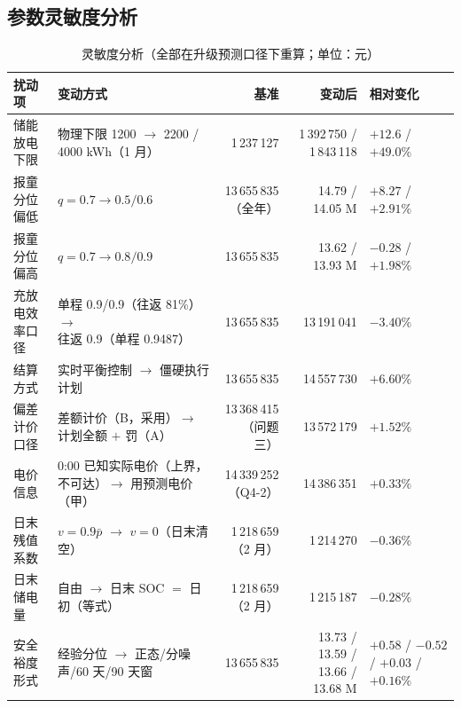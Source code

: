 \documentclass[12pt,a4paper,fontset=fandol]{ctexart}
\begin{document}
\subsection{参数灵敏度分析}

\begin{table}[htbp]
\centering
\caption{灵敏度分析（全部在升级预测口径下重算\nobreak；单位\nobreak：元\nobreak）}
\label{tab:sens}
\begin{tabularx}{\textwidth}{@{}p{2.3cm}p{2.9cm}rRL@{}}
\toprule
扰动项 & 变动方式 & 基准 & 变动后 & 相对变化 \\
\midrule
储能放电下限 & 物理下限 1200 $\to$ 2200 / 4000 kWh（1 月\nobreak） & 1\,237\,127 & 1\,392\,750 / 1\,843\,118 & $+12.6$ / $+49.0\text{\%}$ \\
报童分位偏低 & $q=0.7\to0.5/0.6$ & 13\,655\,835（全年\nobreak） & 14.79 / 14.05 M & $+8.27$ / $+2.91\text{\%}$ \\
报童分位偏高 & $q=0.7\to0.8/0.9$ & 13\,655\,835 & 13.62 / 13.93 M & $-0.28$ / $+1.98\text{\%}$ \\
充放电效率口径 & 单程 0.9/0.9（往返 81\%\nobreak）$\to$ 往返 0.9（单程 0.9487\nobreak） & 13\,655\,835 & 13\,191\,041 & $-3.40\text{\%}$ \\
结算方式 & 实时平衡控制 $\to$ 僵硬执行计划 & 13\,655\,835 & 14\,557\,730 & $+6.60\text{\%}$ \\
偏差计价口径 & 差额计价（B\nobreak，采用\nobreak）$\to$ 计划全额 $+$ 罚（A\nobreak） & 13\,368\,415（问题三\nobreak） & 13\,572\,179 & $+1.52\text{\%}$ \\
电价信息 & 0:00 已知实际电价（上界\nobreak，不可达\nobreak）$\to$ 用预测电价（甲\nobreak） & 14\,339\,252（Q4-2\nobreak） & 14\,386\,351 & $+0.33\text{\%}$ \\
日末残值系数 & $v=0.9\bar p$ $\to$ $v=0$（日末清空\nobreak） & 1\,218\,659（2 月\nobreak） & 1\,214\,270 & $-0.36\text{\%}$ \\
日末储电量 & 自由 $\to$ 日末 SOC $=$ 日初（等式\nobreak） & 1\,218\,659（2 月\nobreak） & 1\,215\,187 & $-0.28\text{\%}$ \\
安全裕度形式 & 经验分位 $\to$ 正态/分噪声/60 天/90 天窗 & 13\,655\,835 & 13.73 / 13.59 / 13.66 / 13.68 M & $+0.58$ / $-0.52$ / $+0.03$ / $+0.16\text{\%}$ \\
\bottomrule
\end{tabularx}
\end{table}
\end{document}
